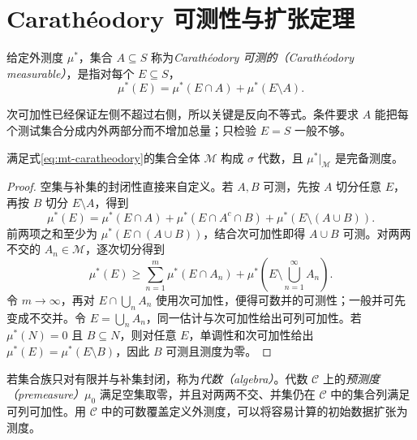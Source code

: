 \section{Carathéodory 可测性与扩张定理}
\begin{definition}
给定外测度 $\mu^*$，集合 $A\subseteq S$ 称为\emph{Carathéodory 可测的（Carathéodory measurable）}，是指对每个 $E\subseteq S$，
\begin{equation}
 \mu^*(E)=\mu^*(E\cap A)+\mu^*(E\setminus A).
 \label{eq:mt-caratheodory}
\end{equation}
\end{definition}
次可加性已经保证左侧不超过右侧，所以关键是反向不等式。条件要求 $A$ 能把每个测试集合分成内外两部分而不增加总量；只检验 $E=S$ 一般不够。

\begin{theorem}
满足式\eqref{eq:mt-caratheodory}的集合全体 $\mathcal M$ 构成 $\sigma$ 代数，且 $\mu^*|_{\mathcal M}$ 是完备测度。
\label{thm:mt-caratheodory}
\end{theorem}
\begin{proof}
空集与补集的封闭性直接来自定义。若 $A,B$ 可测，先按 $A$ 切分任意 $E$，再按 $B$ 切分 $E\setminus A$，得到
\[
 \mu^*(E)=\mu^*(E\cap A)+\mu^*(E\cap A^c\cap B)
             +\mu^*(E\setminus(A\cup B)).
\]
前两项之和至少为 $\mu^*(E\cap(A\cup B))$，结合次可加性即得 $A\cup B$ 可测。对两两不交的 $A_n\in\mathcal M$，逐次切分得到
\[
 \mu^*(E)\geq\sum_{n=1}^{m}\mu^*(E\cap A_n)
       +\mu^*\!\left(E\setminus\bigcup_{n=1}^{\infty}A_n\right).
\]
令 $m\to\infty$，再对 $E\cap\bigcup_nA_n$ 使用次可加性，便得可数并的可测性；一般并可先变成不交并。令 $E=\bigcup_nA_n$，同一估计与次可加性给出可列可加性。若 $\mu^*(N)=0$ 且 $B\subseteq N$，则对任意 $E$，单调性和次可加性给出 $\mu^*(E)=\mu^*(E\setminus B)$，因此 $B$ 可测且测度为零。
\end{proof}

若集合族只对有限并与补集封闭，称为\emph{代数（algebra）}。代数 $\mathcal C$ 上的\emph{预测度（premeasure）}$\mu_0$ 满足空集取零，并且对两两不交、并集仍在 $\mathcal C$ 中的集合列满足可列可加性。用 $\mathcal C$ 中的可数覆盖定义外测度，可以将容易计算的初始数据扩张为测度。

